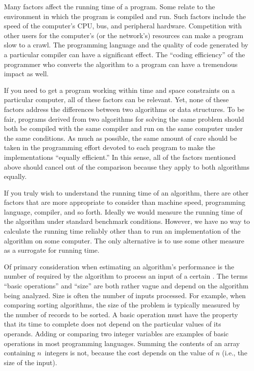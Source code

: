 Many factors affect the running time of a program.
Some relate to the environment in which the program
is compiled and run.
Such factors include the speed of the computer's CPU, bus, and
peripheral hardware.
Competition with other users for the computer's (or the network's)
resources can make a program slow to a crawl.
The programming language and the quality of code generated by a
particular compiler can have a significant
effect.
The ``coding efficiency'' of the programmer
who converts the algorithm to a program can have a tremendous impact
as well.

If you need to get a program working within time and space
constraints on a particular computer, all of these factors can be
relevant.
Yet, none of these factors address the differences between
two algorithms or data structures.
To be fair, programs derived from two algorithms for solving the same
problem should both be compiled with the same compiler
and run on the same computer under the same conditions.
As much as possible, the same amount of care should be taken in
the programming effort devoted to each program to make the
implementations ``equally efficient.''
In this sense, all of the factors mentioned above should cancel
out of the comparison because they apply to both algorithms equally.

If you truly wish to understand the running time of an algorithm,
there are other factors that are more appropriate to consider than
machine speed, programming language, compiler, and so
forth.
Ideally we would measure the running time of the algorithm under
standard benchmark conditions.
However, we have no way to calculate the running time reliably other
than to run an implementation of the algorithm on some computer.
The only alternative is to use some other measure as a surrogate for
running time.

Of primary consideration when estimating an algorithm's performance
is the number of
 required by
the algorithm to process an input of a certain
.
The terms ``basic operations'' and ``size'' are both
rather vague and depend on the algorithm being analyzed.
Size is often the number of inputs processed.
For example, when comparing sorting algorithms,
the size of the problem is typically measured by the number of
records to be sorted. 
A basic operation must have the property that its time to
complete does not depend on the particular values of its operands.
Adding or comparing two integer variables are examples of basic
operations in most programming languages.
Summing the contents of an array containing \(n\)~integers is not,
because the cost depends on the value of \(n\) (i.e., the size of the
input).

